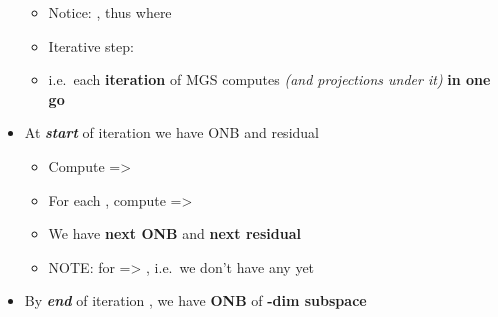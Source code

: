 \begin{itemize}
\begin{itemize}
          \item
                Notice: , thus
                where
          \item
                Iterative step:
          \item
                i.e.~each \textbf{iteration } of MGS computes
                 \emph{(and
                  projections under it)} \textbf{in one go}
        \end{itemize}
  \item
        At \textbf{\emph{start}} of iteration 
        we have ONB
        and residual

        \begin{itemize}

          \item
                Compute
                =\textgreater{}
          \item
                For each , compute
                =\textgreater{}
          \item
                We have \textbf{next ONB}
                 and
                \textbf{next residual}
          \item
                NOTE: for  =\textgreater{}
                ,
                i.e.~we don't have any yet
        \end{itemize}
  \item
        By \textbf{\emph{end}} of iteration , we have \textbf{ONB}
        of \textbf{-dim subspace}


\end{itemize}
